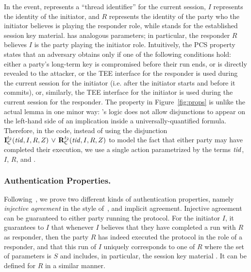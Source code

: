 In the \mIComplete{} event, \mTID{} represents a ``thread identifier'' for the
current session, $I$ represents the identity of the initiator,
and $R$ represents the identity of the party who the initiator believes is
playing the responder role, while \mSessKey{} stands for the established
session key material.
%
\mRComplete{} has analogous parameters; in particular, the responder $R$
believes $I$ is the party playing the initiator role.
%
Intuitively, the PCS property states that an adversary obtains \mSessKey{}
only if one of the following conditions hold: either a party's long-term key
is compromised before their run ends, or \mSessKey{} is directly revealed to
the attacker, or the TEE interface for the responder is used during the current
session for the initiator (i.e. after the initiator starts and before it
commits), or, similarly, the TEE interface for the initiator is used during the
current session for the responder.
%
The property in Figure~\ref{fig:props} is unlike the actual \mTamarin{} lemma
in one minor way: \mTamarin's logic does not allow disjunctions to appear on
the left-hand side of an implication inside a universally-quantified formula.
%
Therefore, in the \mTamarin{} code, instead of using the disjunction
$\mathbf{I}_{\textsf{C}}^{t_2}(\mathit{tid}, I, R, Z)\, \lor\, 
\mathbf{R}_{\textsf{C}}^{t_2}(\mathit{tid}, I, R, Z)$
to model the fact that either party may have completed their execution, we use
a single action parametrized by the terms $\mathit{tid}$, $I$, $R$, and \mSessKey.

\subsubsection{Authentication Properties.}
\label{sec:authenticationDef}
Following~\cite{Norr21}, we prove two different kinds of authentication
properties, namely \emph{injective agreement} in the style
of~\cite{DBLP:conf/csfw/Lowe97a}, and implicit agreement.
%
Injective agreement can be guaranteed to either party running the protocol.
%
For the initiator $I$, it guarantees to $I$ that whenever $I$ believes that
they have completed a run with $R$ as responder, then the party $R$ has 
indeed
executed the protocol in the role of a responder, and that this run of $I$
uniquely corresponds to one of $R$ where the set of parameters is $S$ and
includes, in particular, the session key material \mSessKey{}.
%
It can be defined for $R$ in a similar manner.

